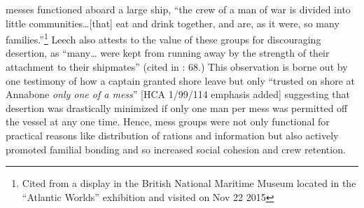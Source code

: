 messes functioned aboard a large ship, “the crew of a man of war is divided into little communities…[that] eat and drink together, and are, as it were, so many families.”\footnote{Cited from a display in the British National Maritime Museum located in the “Atlantic Worlds” exhibition and visited on Nov 22 2015} Leech also attests to the value of these groups for discouraging desertion, as “many… were kept from running away by the strength of their attachment to their shipmates” (cited in \citealt{AdkinsAdkins2008}: 68.) This observation is borne out by one testimony of how a captain granted shore leave but only “trusted on shore at Annabone \textit{only one of a mess}” [HCA 1/99/114 emphasis added] suggesting that desertion was drastically minimized if only one man per mess was permitted off the vessel at any one time. Hence, mess groups were not only functional for practical reasons like distribution of rations and information but also actively promoted familial bonding and so increased social cohesion and crew retention.  

